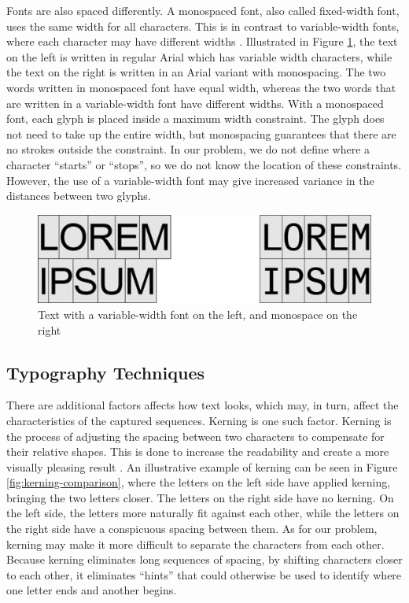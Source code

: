 Fonts are also spaced differently. A monospaced font, also called fixed-width font, uses the same width for all characters. This is in contrast to variable-width fonts, where each character may have different widths \citep{felici2011complete}. Illustrated in Figure \ref{fig:regular-mono-comparison}, the text on the left is written in regular Arial which has variable width characters, while the text on the right is written in an Arial variant with monospacing. The two words written in monospaced font have equal width, whereas the two words that are written in a variable-width font have different widths. With a monospaced font, each glyph is placed inside a maximum width constraint. The glyph does not need to take up the entire width, but monospacing guarantees that there are no strokes outside the constraint. In our problem, we do not define where a character ``starts'' or ``stops'', so we do not know the location of these constraints. However, the use of a variable-width font may give increased variance in the distances between two glyphs.

\begin{figure}[h]
    \centering
    \includegraphics[width=1.0\textwidth]{fig/chapter2/regular_mono_comparison.png}
    \caption{Text with a variable-width font on the left, and monospace on the right}
    \label{fig:regular-mono-comparison}
\end{figure}

\subsection{Typography Techniques}
\label{sec:other_factors}
There are additional factors affects how text looks, which may, in turn, affect the characteristics of the captured sequences. Kerning is one such factor. Kerning is the process of adjusting the spacing between two characters to compensate for their relative shapes. This is done to increase the readability and create a more visually pleasing result \citep{felici2011complete}. An illustrative example of kerning can be seen in Figure \ref{fig:kerning-comparison}, where the letters on the left side have applied kerning, bringing the two letters closer. The letters on the right side have no kerning. On the left side, the letters more naturally fit against each other, while the letters on the right side have a conspicuous spacing between them. As for our problem, kerning may make it more difficult to separate the characters from each other. Because kerning eliminates long sequences of spacing, by shifting characters closer to each other, it eliminates ``hints'' that could otherwise be used to identify where one letter ends and another begins.

